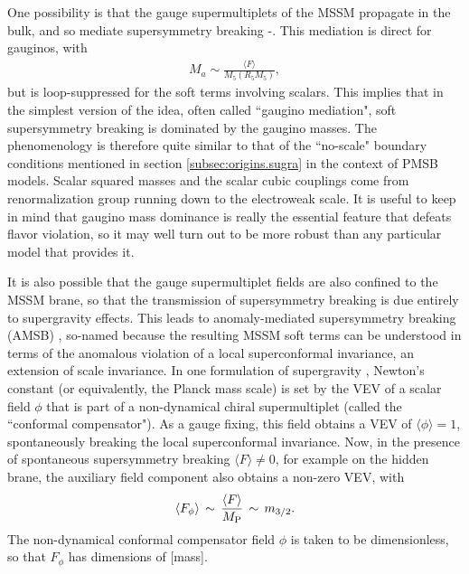 \documentclass[12pt]{article}
\def\beq{\begin{eqnarray}}
\def\eeq{\end{eqnarray}}
\def\MPlanck{M_{\rm P}}
\begin{document}
One possibility is that the gauge supermultiplets of the MSSM propagate in 
the bulk, and so mediate supersymmetry breaking 
\cite{MirabelliPeskin}-\cite{deconstructedgauginomediation}. 
This mediation is direct for gauginos, with
\beq
M_a \sim \frac{\langle F \rangle}{M_5(R_5 M_5)} ,
\eeq
but is loop-suppressed for the soft terms involving
scalars. This implies that in the simplest 
version of the idea, often called ``gaugino mediation", soft supersymmetry 
breaking is dominated by the gaugino masses. The phenomenology is 
therefore quite similar to that of the ``no-scale" boundary conditions 
mentioned in section \ref{subsec:origins.sugra} in the context of PMSB 
models. Scalar squared masses and the scalar cubic couplings come from 
renormalization group running down to the electroweak scale.  It is useful 
to keep in mind that gaugino mass dominance is really the essential 
feature that defeats flavor violation, so it may well 
turn out to be more robust 
than any particular model that provides it.

It is also possible that the gauge supermultiplet fields are also confined 
to the MSSM brane, so that the transmission of supersymmetry breaking is 
due entirely to supergravity effects. This leads to
anomaly-mediated supersymmetry breaking (AMSB) \cite{AMSB}, so-named 
because the resulting MSSM soft terms can be understood in terms of the 
anomalous violation of a local superconformal invariance, an extension of 
scale invariance. In one formulation of supergravity 
\cite{superconformalsupergravity}, Newton's constant (or equivalently, the 
Planck mass scale) is set by the VEV of a scalar field $\phi$ that is part 
of a non-dynamical chiral supermultiplet (called the ``conformal 
compensator"). As a gauge fixing, this field obtains a VEV of $\langle 
\phi \rangle = 1$, spontaneously breaking the local superconformal 
invariance. Now, in the presence of spontaneous supersymmetry breaking 
$\langle F \rangle \not= 0$, for example on the hidden brane, the 
auxiliary field component also obtains a non-zero VEV, with
\beq
\langle F_\phi \rangle 
\,\sim\, 
\frac{\langle F \rangle}{\MPlanck} 
\,\sim\,
m_{3/2} .
\label{eq:AMSBgravitino}
\eeq
The non-dynamical conformal compensator field $\phi$ is taken to 
be dimensionless, so that $F_\phi$ has dimensions of [mass].
 
\end{document}
